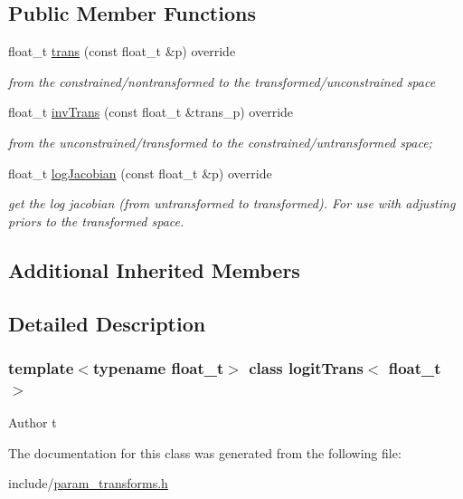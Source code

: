 \subsection*{Public Member Functions}
\begin{DoxyCompactItemize}
\item 
\mbox{\label{classlogitTrans_aee8d4c1429bebe62aefb64f07f88d8e0}} 
float\+\_\+t \hyperlink{classlogitTrans_aee8d4c1429bebe62aefb64f07f88d8e0}{trans} (const float\+\_\+t \&p) override
\begin{DoxyCompactList}\small\item\em from the constrained/nontransformed to the transformed/unconstrained space \end{DoxyCompactList}\item 
\mbox{\label{classlogitTrans_ae0211473231a08e0a6feb54301ba8e45}} 
float\+\_\+t \hyperlink{classlogitTrans_ae0211473231a08e0a6feb54301ba8e45}{inv\+Trans} (const float\+\_\+t \&trans\+\_\+p) override
\begin{DoxyCompactList}\small\item\em from the unconstrained/transformed to the constrained/untransformed space; \end{DoxyCompactList}\item 
\mbox{\label{classlogitTrans_aef153d5f930c7c96e6f12c0def6220d9}} 
float\+\_\+t \hyperlink{classlogitTrans_aef153d5f930c7c96e6f12c0def6220d9}{log\+Jacobian} (const float\+\_\+t \&p) override
\begin{DoxyCompactList}\small\item\em get the log jacobian (from untransformed to transformed). For use with adjusting priors to the transformed space. \end{DoxyCompactList}\end{DoxyCompactItemize}
\subsection*{Additional Inherited Members}


\subsection{Detailed Description}
\subsubsection*{template$<$typename float\+\_\+t$>$\newline
class logit\+Trans$<$ float\+\_\+t $>$}

\begin{DoxyAuthor}{Author}
t 
\end{DoxyAuthor}


The documentation for this class was generated from the following file\+:\begin{DoxyCompactItemize}
\item 
include/\hyperlink{param__transforms_8h}{param\+\_\+transforms.\+h}\end{DoxyCompactItemize}
